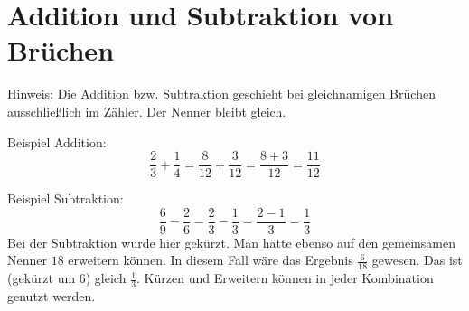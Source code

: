 	\section{Addition und Subtraktion von Brüchen}\vspace{-1em}

Hinweis: Die Addition bzw. Subtraktion geschieht bei gleichnamigen Brüchen ausschließlich im Zähler. Der Nenner bleibt gleich.

Beispiel Addition:
\begin{equation*}
	\frac{2}{3}+\frac{1}{4}= \frac{8}{12}+\frac{3}{12}= \frac{8+3}{12}=\frac{11}{12}
\end{equation*}

Beispiel Subtraktion:
\begin{equation*}
	\frac{6}{9}-\frac{2}{6}= \frac{2}{3}-\frac{1}{3}= \frac{2-1}{3}=\frac{1}{3}
\end{equation*}
Bei der Subtraktion wurde hier gekürzt. Man hätte ebenso auf den gemeinsamen Nenner $18$ erweitern können. In diesem Fall wäre das Ergebnis $\frac{6}{18}$ gewesen. Das ist (gekürzt um $6$) gleich $\frac{1}{3}$. Kürzen und Erweitern können in jeder Kombination genutzt werden.